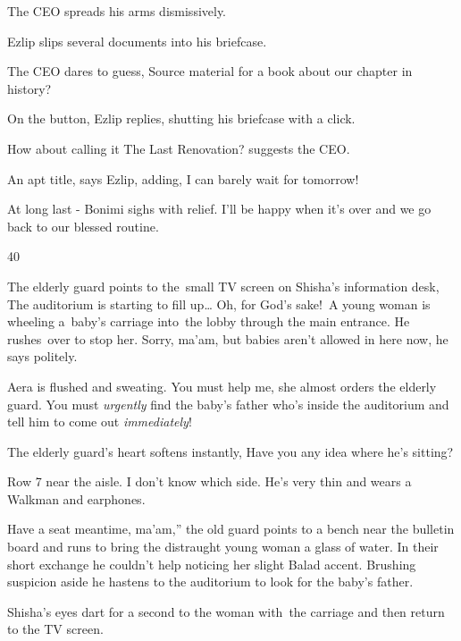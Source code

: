 \documentclass[letterpaper]{article}
\begin{document}
The CEO spreads his arms dismissively. 

Ezlip slips several documents into his briefcase.\textbf{\ }

The CEO dares to guess, {\textquotedbl}Source material for a book about our chapter in history?{\textquotedbl} 

{\textquotedbl}On the button,{\textquotedbl} Ezlip replies, shutting his briefcase with a click. 

{\textquotedbl}How about calling it The Last Renovation?{\textquotedbl} suggests the CEO. 

{\textquotedbl}An apt title,{\textquotedbl} says Ezlip, adding, {\textquotedbl}I can barely wait for
tomorrow!{\textquotedbl}

{\textquotedbl}At long last -{\textquotedbl} Bonimi sighs with relief. {\textquotedbl}I'll be happy when it's over and
we go back to our blessed routine.{\textquotedbl}


\bigskip

40\ \ 

The elderly guard points to the~small TV screen on Shisha's information desk, {\textquotedbl}The auditorium is starting
to fill up{\dots} Oh, for God's sake!{\textquotedbl}\ A young woman is wheeling a~baby's carriage into~the lobby
through the main entrance. He rushes\textcolor[rgb]{0.0,0.4392157,0.7529412}{\ }over to stop her. {\textquotedbl}Sorry,
ma'am, but babies aren't allowed in here now,{\textquotedbl} he says politely.

Aera is flushed and sweating. {\textquotedbl}You must help me,{\textquotedbl} she almost orders the elderly guard.
{\textquotedbl}You must \textit{urgently} find the baby's father who's inside the auditorium and tell him to come out
\textit{immediately}!{\textquotedbl} 

The elderly guard's heart softens instantly, {\textquotedbl}Have you any idea where he's sitting?{\textquotedbl}

{\textquotedbl}Row 7 near the aisle. I don't know which side. He's very thin and wears a Walkman and
earphones.{\textquotedbl} 

{\textquotedbl}Have a seat meantime, ma'am,'' the old guard points to a bench near the bulletin board and runs to bring
the distraught young woman a glass of water. In their short exchange he couldn't help noticing her slight Balad accent.
Brushing suspicion aside he hastens to the auditorium to look for the baby's father.

Shisha's eyes dart for a second to the woman with\textcolor[rgb]{0.0,0.4392157,0.7529412}{\ }the carriage and then
return to the TV screen.
\end{document}
